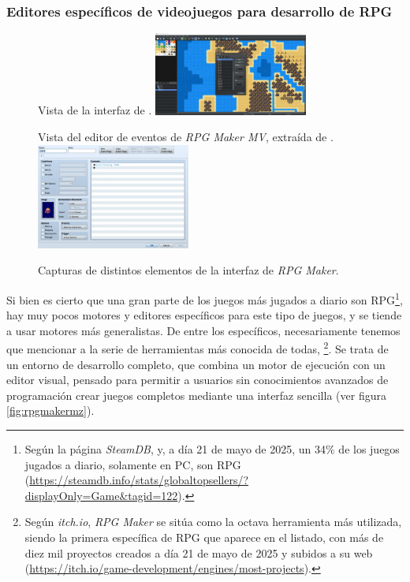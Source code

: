 \subsubsection{Editores específicos de videojuegos para desarrollo de RPG}
\begin{figure}[h]
\centering
\begin{SubFloat}
{\label{fig:rpgmakermz}%
	Vista de la interfaz de \cite{rpgmakermz}.}%
	\includegraphics[width=0.45\textwidth]{Imagenes/Bitmap/rpgmakermz}%
\end{SubFloat}
\qquad
\begin{SubFloat}
{\label{fig:rpgmakerevent}%
	Vista del editor de eventos de \textit{RPG Maker MV}, extraída de \cite{rpgmakerevent}.}%
	\includegraphics[width=0.45\textwidth]{Imagenes/Bitmap/rpgmakereventeditor}%
\end{SubFloat}
\caption{Capturas de distintos elementos de la interfaz de \textit{RPG Maker}. \label{fig:rpgmaker}}
\end{figure}

Si bien es cierto que una gran parte de los juegos más jugados a diario son RPG\footnote{Según la página \textit{SteamDB}, y, a día 21 de mayo de 2025, un 34\% de los juegos jugados a diario, solamente en PC, son RPG (\url{https://steamdb.info/stats/globaltopsellers/?displayOnly=Game&tagid=122}).}, hay muy pocos motores y editores específicos para este tipo de juegos, y se tiende a usar motores más generalistas. De entre los específicos, necesariamente tenemos que mencionar a la serie de herramientas más conocida de todas, \cite{rpgmaker}\footnote{Según \textit{itch.io}, \textit{RPG Maker} se sitúa como la octava herramienta más utilizada, siendo la primera específica de RPG que aparece en el listado, con más de diez mil proyectos creados a día 21 de mayo de 2025 y subidos a su web (\url{https://itch.io/game-development/engines/most-projects}).}. Se trata de un entorno de desarrollo completo, que combina un motor de ejecución con un editor visual, pensado para permitir a usuarios sin conocimientos avanzados de programación crear juegos completos mediante una interfaz sencilla (ver figura \ref{fig:rpgmakermz}).

